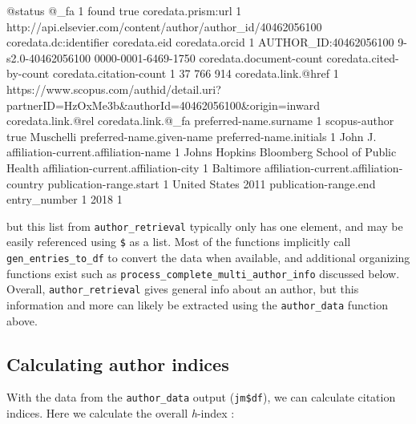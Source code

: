\begin{Schunk}
\begin{Soutput}
  @status @_fa
1   found true
                                            coredata.prism:url
1 http://api.elsevier.com/content/author/author_id/40462056100
  coredata.dc:identifier       coredata.eid      coredata.orcid
1  AUTHOR_ID:40462056100 9-s2.0-40462056100 0000-0001-6469-1750
  coredata.document-count coredata.cited-by-count coredata.citation-count
1                      37                     766                     914
                                                                             coredata.link.@href
1 https://www.scopus.com/authid/detail.uri?partnerID=HzOxMe3b&authorId=40462056100&origin=inward
  coredata.link.@rel coredata.link.@_fa preferred-name.surname
1      scopus-author               true              Muschelli
  preferred-name.given-name preferred-name.initials
1                      John                      J.
             affiliation-current.affiliation-name
1 Johns Hopkins Bloomberg School of Public Health
  affiliation-current.affiliation-city
1                            Baltimore
  affiliation-current.affiliation-country publication-range.start
1                           United States                    2011
  publication-range.end entry_number
1                  2018            1
\end{Soutput}
\end{Schunk}

but this list from \texttt{author\_retrieval} typically only has one
element, and may be easily referenced using \texttt{\$} as a list. Most
of the functions implicitly call \texttt{gen\_entries\_to\_df} to
convert the data when available, and additional organizing functions
exist such as \texttt{process\_complete\_multi\_author\_info} discussed
below. Overall, \texttt{author\_retrieval} gives general info about an
author, but this information and more can likely be extracted using the
\texttt{author\_data} function above.

\hypertarget{calculating-author-indices}{%
\subsection{Calculating author
indices}\label{calculating-author-indices}}

With the data from the \texttt{author\_data} output (\texttt{jm\$df}),
we can calculate citation indices. Here we calculate the overall
\emph{h}-index \citep{hirsch2005index}:

